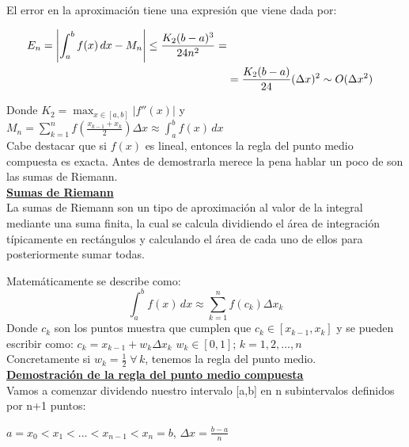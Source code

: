 \documentclass{article}
\begin{document}
			El error en la aproximación tiene una expresión que viene dada por:
			
			\begin{align}
				E_n=\left\lvert \int_{a}^{b} f(x) \,dx-M_n \right\rvert \leq \frac{K_2(b-a){^3}}{24n^2}= \notag \\
				&=\frac{K_2(b-a)}{24}(\Delta x){^2}\sim O(\Delta x^2)     
			\end{align}
			
			Donde $K_2=\max_{x \in [a,b]}\left\lvert f''(x) \right\rvert$
			y $M_n=\sum_{k = 1}^{n}f(\frac{x_{k-1}+x_k}{2})\Delta x \approx \int_{a}^{b} f(x) \,dx$ \\
			
			Cabe destacar que si $f(x)$ es lineal, entonces la regla del  punto medio compuesta es exacta. Antes de demostrarla merece la pena hablar un poco de  son las sumas de Riemann.\\
			
			\underline{\textbf{Sumas de Riemann}} \\
			
			La sumas de Riemann son un tipo de aproximación al valor de la integral mediante una suma finita, la cual se calcula dividiendo el área de integración típicamente en rectángulos y calculando el área de  cada uno de ellos para posteriormente sumar todas. \\
			\par
			Matemáticamente se describe como: 
			\begin{equation}
				\int_{a}^{b} f(x) \,dx \approx \sum_{k = 1}^{n} f(c_k)\Delta x_k   
			\end{equation}
			Donde $c_k$ son los puntos muestra que cumplen que $c_k \in [x_{k-1},x_k]$ y se pueden escribir como: $c_k=x_{k-1}+w_k\Delta x_k$ \;$w_k \in [0,1]$; $k=1,2,...,n$ \\

			Concretamente si $w_k=\frac{1}{2}\;\forall\,k$, tenemos la regla del punto medio.\\

			\underline{\textbf{Demostración de la regla del punto medio compuesta}}\\
			
			Vamos a comenzar dividendo nuestro intervalo [a,b] en n subintervalos definidos por n+1 puntos: 

			\begin{center}
				$a=x_0<x_1<...<x_{n-1}<x_n=b$, $\Delta x=\frac{b-a}{n} $ 
			\end{center}
\end{document}
